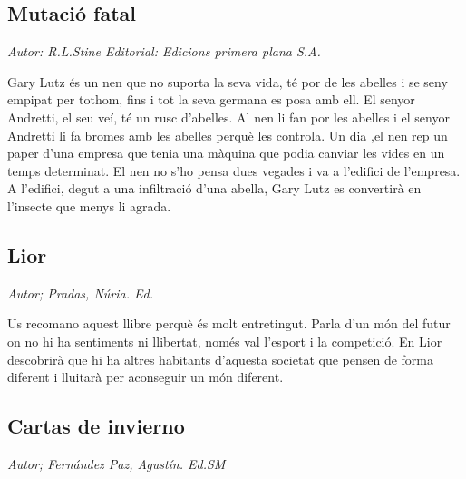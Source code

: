 \begin{news}

\subsection*{Mutació fatal}
\emph{Autor: R.L.Stine  Editorial: Edicions primera plana S.A.}


\noindent{}

Gary Lutz és un nen que no suporta la seva vida, té por de les abelles i se seny empipat per tothom, fins i tot la seva germana es posa amb ell. El senyor Andretti, el seu veí, té un rusc d’abelles. Al nen li fan por les abelles i el senyor Andretti li fa bromes amb les abelles perquè les controla. Un dia ,el nen rep un paper d’una empresa que tenia una màquina que podia canviar les vides en un temps determinat. El nen no s’ho pensa dues vegades i va a l’edifici de l’empresa. A l’edifici, degut a una infiltració d’una abella, Gary Lutz es convertirà en l’insecte que menys li agrada.





\subsection*{Lior}
\emph{Autor; Pradas, Núria. Ed.}
 
Us recomano aquest llibre perquè és molt entretingut. Parla d’un món del futur on no hi ha sentiments ni llibertat, només val l’esport i la competició. En Lior descobrirà que hi ha altres habitants d’aquesta societat que pensen de forma diferent i lluitarà per aconseguir un món diferent.



\subsection*{Cartas de invierno}

\emph{Autor; 	Fernández Paz, Agustín. Ed.SM}


\end{news}
